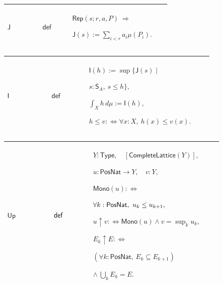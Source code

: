 \documentclass[12pt,reqno]{amsart}
\theoremstyle{blueplain}
\numberwithin{equation}{section}
\begin{document}
{\scriptsize \setlength{\parskip}{0pt}\nointerlineskip
\noindent 
\begin{tabular}{|@{}>{\centering\arraybackslash}m{0.19251\linewidth}|>{\centering\arraybackslash}m{0.16845\linewidth}|>{\centering\arraybackslash}m{0.53904\linewidth}|}
\hline
\hypertarget{def:J}{$\displaystyle \mathsf{J}$} & $\displaystyle \mathsf{def}
$ & $\displaystyle \mathsf{Rep}(s;r,a,P)\ \Longrightarrow$\par$\displaystyle 
\mathsf{J}(s):=\sum_{i<r}a_i\mu(P_i).$ \\ \hline
\end{tabular}%
}

{\scriptsize \setlength{\parskip}{0pt}\nointerlineskip
\noindent 
\begin{tabular}{|@{}>{\centering\arraybackslash}m{0.19251\linewidth}|>{\centering\arraybackslash}m{0.16845\linewidth}|>{\centering\arraybackslash}m{0.53904\linewidth}|}
\hline
\hypertarget{def:I}{$\displaystyle \mathsf{I}$} & $\displaystyle \mathsf{def}
$ & $\displaystyle \mathsf{I}(h):=\sup\{\mathsf{J}(s)\mid$\par$\displaystyle %
s:\mathsf{S}_A,\ s\le h\},$\par$\displaystyle \int_Xh\,d\mu:=\mathsf{I}(h),$%
\par$\displaystyle h\le v:\Longleftrightarrow\forall x:X,\ h(x)\le v(x).$ \\ 
\hline
\end{tabular}%
}

{\scriptsize \setlength{\parskip}{0pt}\nointerlineskip
\noindent 
\begin{tabular}{|@{}>{\centering\arraybackslash}m{0.19251\linewidth}|>{\centering\arraybackslash}m{0.16845\linewidth}|>{\centering\arraybackslash}m{0.53904\linewidth}|}
\hline
\hypertarget{def:Up}{$\displaystyle \mathsf{Up}$} & $\displaystyle \mathsf{%
def}$ & $\displaystyle Y:\mathsf{Type},\quad[\mathsf{CompleteLattice}(Y)],$%
\par$\displaystyle u:\mathsf{PosNat}\to Y,\quad v:Y,$\par$\displaystyle 
\mathsf{Mono}(u):\Longleftrightarrow$\par$\displaystyle \forall k:\mathsf{%
PosNat},\ u_k\le u_{k+1},$\par$\displaystyle u\uparrow v:\Longleftrightarrow%
\mathsf{Mono}(u)\land v=\sup_k u_k,$\par$\displaystyle E_k\uparrow
E:\Longleftrightarrow$\par$\displaystyle (\forall k:\mathsf{PosNat},\
E_k\subseteq E_{k+1})$\par$\displaystyle \land\ \bigcup_k E_k=E.$ \\ \hline
\end{tabular}%
}
\end{document}
